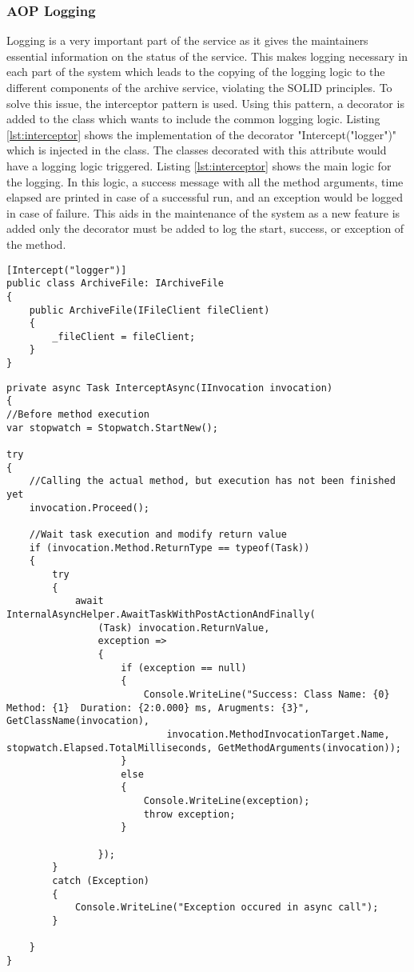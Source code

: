 \subsubsection{AOP Logging}
Logging is a very important part of the service as it gives the maintainers essential information on the status of the service. This makes logging necessary
in each part of the system which leads to the copying of the logging logic to the different components of the archive service, violating the SOLID \cite{Hotop2015} principles. 
To solve this issue, the interceptor pattern is used. Using this pattern, a decorator is added to the class which wants to include the common
logging logic. Listing \ref{lst:interceptor} shows the implementation of the decorator "Intercept("logger")" which is injected in the class. The 
classes decorated with this attribute would have a logging logic triggered. Listing \ref{lst:interceptor} shows the main logic for the logging. In this logic, a success message
with all the method arguments, time elapsed are printed in case of a successful run, and an exception would be logged in case of failure. This aids in the maintenance
of the system as a new feature is added only the decorator must be added to log the start, success, or exception of the method.

\begin{lstlisting}[language={[Sharp]C}, caption={Interceptor decorator example}, captionpos=b,label={lst:interceptor}]
[Intercept("logger")]
public class ArchiveFile: IArchiveFile
{
    public ArchiveFile(IFileClient fileClient)
    {
        _fileClient = fileClient;
    }
}
\end{lstlisting}            

\begin{lstlisting}[language={[Sharp]C}, caption={Interceptor logger logic implementation}, captionpos=b,label={lst:interceptor}]
private async Task InterceptAsync(IInvocation invocation)
{
//Before method execution
var stopwatch = Stopwatch.StartNew();

try
{
    //Calling the actual method, but execution has not been finished yet
    invocation.Proceed();

    //Wait task execution and modify return value
    if (invocation.Method.ReturnType == typeof(Task))
    {
        try
        {
            await InternalAsyncHelper.AwaitTaskWithPostActionAndFinally(
                (Task) invocation.ReturnValue,
                exception =>
                {
                    if (exception == null)
                    {
                        Console.WriteLine("Success: Class Name: {0} Method: {1}  Duration: {2:0.000} ms, Arugments: {3}", GetClassName(invocation),
                            invocation.MethodInvocationTarget.Name, stopwatch.Elapsed.TotalMilliseconds, GetMethodArguments(invocation));
                    }
                    else
                    {
                        Console.WriteLine(exception);
                        throw exception;
                    }
                    
                });
        }
        catch (Exception)
        {
            Console.WriteLine("Exception occured in async call");
        }
        
    }
}
\end{lstlisting}            

